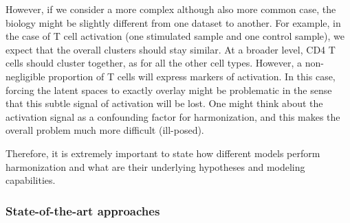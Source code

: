 However, if we consider a more complex although also more common case, the biology might be slightly different from one dataset to another. For example, in the case of T cell activation (one stimulated sample and one control sample), we expect that the overall clusters should stay similar. At a broader level, CD4 T cells should cluster together, as for all the other cell types. However, a non-negligible proportion of T cells will express markers of activation. In this case, forcing the latent spaces to exactly overlay might be problematic in the sense that this subtle signal of activation will be lost. One might think about the activation signal as a confounding factor for harmonization, and this makes the overall problem much more difficult (ill-posed).

Therefore, it is extremely important to state how different models perform harmonization and what are their underlying hypotheses and modeling capabilities.

\subsubsection{State-of-the-art approaches}

